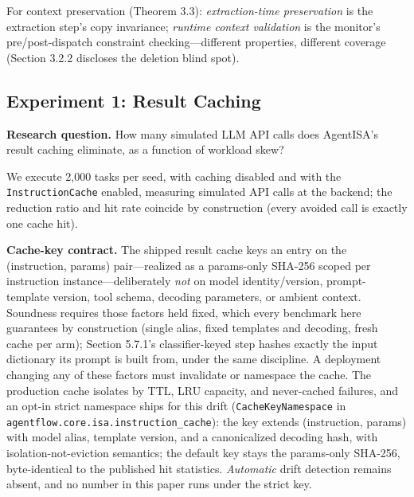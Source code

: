 \documentclass[
  sigconf,
  anonymous]{acmart}
\begin{document}
For context preservation (Theorem 3.3): \emph{extraction-time
preservation} is the extraction step's copy invariance; \emph{runtime
context validation} is the monitor's pre/post-dispatch constraint
checking---different properties, different coverage (Section 3.2.2
discloses the deletion blind spot).

\subsection{Experiment 1: Result
Caching}\label{experiment-1-result-caching}

\textbf{Research question.} How many simulated LLM API calls does
AgentISA's result caching eliminate, as a function of workload skew?

We execute 2,000 tasks per seed, with caching disabled and with the
\texttt{InstructionCache} enabled, measuring simulated API calls at the
backend; the reduction ratio and hit rate coincide by construction
(every avoided call is exactly one cache hit).

\textbf{Cache-key contract.} The shipped result cache keys an entry on
the (instruction, params) pair---realized as a params-only SHA-256
scoped per instruction instance---deliberately \emph{not} on model
identity/version, prompt-template version, tool schema, decoding
parameters, or ambient context. Soundness requires those factors held
fixed, which every benchmark here guarantees by construction (single
alias, fixed templates and decoding, fresh cache per arm); Section
5.7.1's classifier-keyed step hashes exactly the input dictionary its
prompt is built from, under the same discipline. A deployment changing
any of these factors must invalidate or namespace the cache. The
production cache isolates by TTL, LRU capacity, and never-cached
failures, and an opt-in strict namespace ships for this drift
(\texttt{CacheKeyNamespace} in
\texttt{agentflow.core.isa.instruction\_cache}): the key extends
(instruction, params) with model alias, template version, and a
canonicalized decoding hash, with isolation-not-eviction semantics; the
default key stays the params-only SHA-256, byte-identical to the
published hit statistics. \emph{Automatic} drift detection remains
absent, and no number in this paper runs under the strict key.
\end{document}

